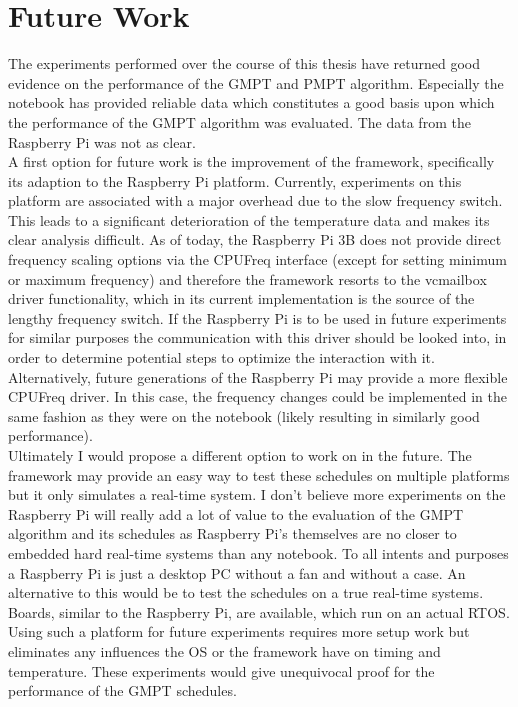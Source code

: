 
\chapter{Future Work}\label{chapter:future_work}
The experiments performed over the course of this thesis have returned good evidence on the performance of the GMPT and PMPT algorithm. Especially the notebook has provided reliable data which constitutes a good basis upon which the performance of the GMPT algorithm was evaluated. The data from the Raspberry Pi was not as clear.\\
\hspace*{0.5ex}\hspace{0.5ex} A first option for future work is the improvement of the framework, specifically its adaption to the Raspberry Pi platform. Currently, experiments on this platform are associated with a major overhead due to the slow frequency switch. This leads to a significant deterioration of the temperature data and makes its clear analysis difficult. As of today, the Raspberry Pi 3B does not provide direct frequency scaling options via the CPUFreq interface (except for setting minimum or maximum frequency) and therefore the framework resorts to the vcmailbox driver functionality, which in its current implementation is the source of the lengthy frequency switch. If the Raspberry Pi is to be used in future experiments for similar purposes the communication with this driver should be looked into, in order to determine potential steps to optimize the interaction with it. Alternatively, future generations of the Raspberry Pi may provide a more flexible CPUFreq driver. In this case, the frequency changes could be implemented in the same fashion as they were on the notebook (likely resulting in similarly good performance).\\
\hspace*{0.5ex}\hspace{0.5ex} Ultimately I would propose a different option to work on in the future. The framework may provide an easy way to test these schedules on multiple platforms but it only simulates a real-time system. I don't believe more experiments on the Raspberry Pi will really add a lot of value to the evaluation of the GMPT algorithm and its schedules as Raspberry Pi's themselves are no closer to embedded hard real-time systems than any notebook. To all intents and purposes a Raspberry Pi is just a desktop PC without a fan and without a case. An alternative to this would be to test the schedules on a true real-time systems. Boards, similar to the Raspberry Pi, are available, which run on an actual RTOS. Using such a platform for future experiments requires more setup work but eliminates any influences the OS or the framework have on timing and temperature. These experiments would give unequivocal proof for the performance of the GMPT schedules.
\afterpage{\null\newpage}